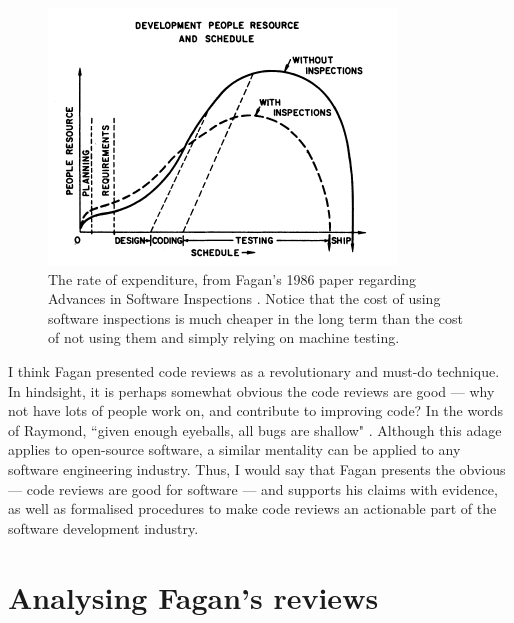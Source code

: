 \begin{figure}
\centering
\includegraphics{media/SWInspection_Graph}
\caption{The rate of expenditure, from Fagan's 1986 paper regarding Advances in Software Inspections
	\cite{AdvancesInSoftwareInspection}. Notice that the cost of using software inspections is much
cheaper in the long term than the cost of not using them and simply relying on machine testing.}
\label{fig:codeRev:costs}
\end{figure}

I think Fagan presented code reviews as a revolutionary and must-do technique.
In hindsight, it is perhaps somewhat obvious the code reviews are good --- why not have lots of
people work on, and contribute to improving code?
In the words of Raymond, ``given enough eyeballs, all bugs are shallow" \cite{raymond1999cathedral}.
Although this adage applies to open-source software, a similar mentality can be applied to any
software engineering industry.
Thus, I would say that Fagan presents the obvious --- code reviews are good for software --- and
supports his claims with evidence, as well as formalised procedures to make code reviews an
actionable part of the software development industry.

\section{Analysing Fagan's reviews} \label{sec:litsurvey:strWeak}

